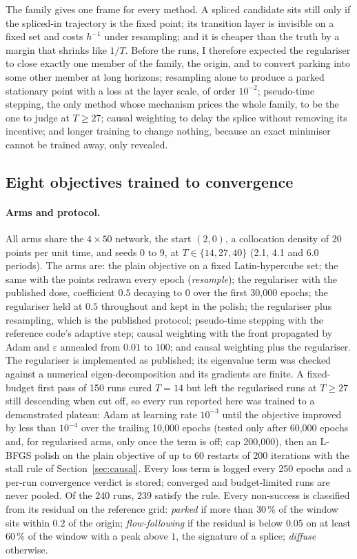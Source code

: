 \documentclass[11pt,a4paper]{article}
\begin{document}
The family gives one frame for every method. A spliced candidate sits
still only if the spliced-in trajectory is the fixed point; its
transition layer is invisible on a fixed set and costs $h^{-1}$ under
resampling; and it is cheaper than the truth by a margin that shrinks
like $1/T$. Before the runs, I therefore expected the regulariser to
close exactly one member of the family, the origin, and to convert
parking into some other member at long horizons; resampling alone to
produce a parked stationary point with a loss at the layer scale, of
order $10^{-2}$; pseudo-time stepping, the only method whose mechanism
prices the whole family, to be the one to judge at $T \ge 27$; causal
weighting to delay the splice without removing its incentive; and
longer training to change nothing, because an exact minimiser cannot be
trained away, only revealed.

\subsection{Eight objectives trained to convergence}
\label{sec:arms}

\paragraph{Arms and protocol.}
All arms share the $4\times50$ network, the start $(2, 0)$, a
collocation density of 20 points per unit time, and seeds 0 to 9, at
$T \in \{14, 27, 40\}$ (2.1, 4.1 and 6.0 periods). The arms are: the
plain objective on a fixed Latin-hypercube set; the same with the
points redrawn every epoch (\emph{resample}); the regulariser with the
published dose, coefficient $0.5$ decaying to $0$ over the first 30,000
epochs; the regulariser held at $0.5$ throughout and kept in the
polish; the regulariser plus resampling, which is the published
protocol; pseudo-time stepping with the reference code's adaptive step;
causal weighting with the front propagated by Adam and $\varepsilon$
annealed from $0.01$ to $100$; and causal weighting plus the
regulariser. The regulariser is implemented as published; its
eigenvalue term was checked against a numerical eigen-decomposition and
its gradients are finite. A fixed-budget first pass of 150 runs cured
$T = 14$ but left the regularised runs at $T \ge 27$ still descending
when cut off, so every run reported here was trained to a demonstrated
plateau: Adam at learning rate $10^{-3}$ until the objective improved by
less than $10^{-4}$ over the trailing 10,000 epochs (tested only after
60,000 epochs and, for regularised arms, only once the term is off; cap
200,000), then an L-BFGS polish on the plain objective of up to 60
restarts of 200 iterations with the stall rule of Section~\ref{sec:causal}.
Every loss term is logged every 250 epochs and a per-run convergence
verdict is stored; converged and budget-limited runs are never pooled.
Of the 240 runs, 239 satisfy the rule. Every non-success is classified
from its residual on the reference grid: \emph{parked} if more than
30\,\% of the window sits within $0.2$ of the origin;
\emph{flow-following} if the residual is below $0.05$ on at least
60\,\% of the window with a peak above $1$, the signature of a splice;
\emph{diffuse} otherwise.
\end{document}
